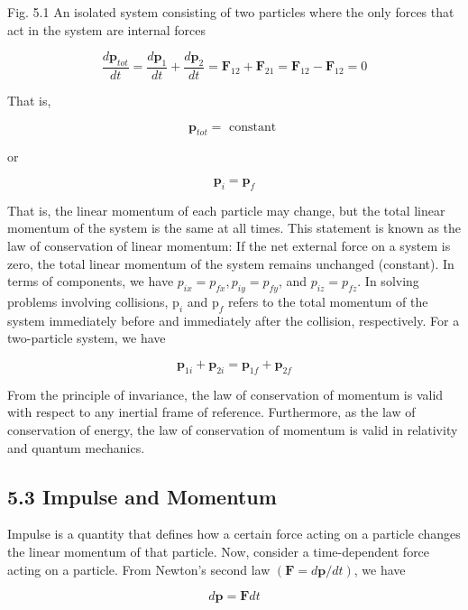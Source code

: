 \documentclass[10pt]{article}
\begin{document}
Fig. 5.1 An isolated system consisting of two particles where the only forces that act in the system are internal forces

$$
\frac{d \mathbf{p}_{t o t}}{d t}=\frac{d \mathbf{p}_{1}}{d t}+\frac{d \mathbf{p}_{2}}{d t}=\mathbf{F}_{12}+\mathbf{F}_{21}=\mathbf{F}_{12}-\mathbf{F}_{12}=0
$$

That is,

$$
\mathbf{p}_{t o t}=\text { constant }
$$

or

$$
\mathbf{p}_{i}=\mathbf{p}_{f}
$$

That is, the linear momentum of each particle may change, but the total linear momentum of the system is the same at all times. This statement is known as the law of conservation of linear momentum: If the net external force on a system is zero, the total linear momentum of the system remains unchanged (constant). In terms of components, we have $p_{i x}=p_{f x}, p_{i y}=p_{f y}$, and $p_{i z}=p_{f z}$. In solving problems involving collisions, $\mathrm{p}_{i}$ and $\mathrm{p}_{f}$ refers to the total momentum of the system immediately before and immediately after the collision, respectively. For a two-particle system, we have

$$
\mathbf{p}_{1 i}+\mathbf{p}_{2 i}=\mathbf{p}_{1 f}+\mathbf{p}_{2 f}
$$

From the principle of invariance, the law of conservation of momentum is valid with respect to any inertial frame of reference. Furthermore, as the law of conservation of energy, the law of conservation of momentum is valid in relativity and quantum mechanics.

\subsection*{5.3 Impulse and Momentum}
Impulse is a quantity that defines how a certain force acting on a particle changes the linear momentum of that particle. Now, consider a time-dependent force acting on a particle. From Newton's second law $(\mathbf{F}=d \mathbf{p} / d t)$, we have

$$
d \mathbf{p}=\mathbf{F} d t
$$
\end{document}
